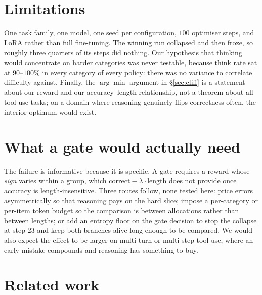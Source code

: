 \documentclass[10pt,twocolumn]{article}
\newcommand{\lam}{\lambda}
\begin{document}
\section{Limitations}

One task family, one model, one seed per configuration, $100$ optimiser steps,
and LoRA rather than full fine-tuning. The winning run collapsed and then froze,
so roughly three quarters of its steps did nothing. Our hypothesis that thinking
would concentrate on harder categories was never testable, because think rate sat
at $90$--$100\%$ in every category of every policy: there was no variance to
correlate difficulty against. Finally, the $\arg\min$ argument in
\S\ref{sec:cliff} is a statement about our reward and our accuracy--length
relationship, not a theorem about all tool-use tasks; on a domain where reasoning
genuinely flips correctness often, the interior optimum would exist.

\section{What a gate would actually need}

The failure is informative because it is specific. A gate requires a reward whose
\emph{sign} varies within a group, which $\text{correct}-\lam\cdot\text{length}$
does not provide once accuracy is length-insensitive. Three routes follow, none
tested here: price errors asymmetrically so that reasoning pays on the hard
slice; impose a per-category or per-item token budget so the comparison is
between allocations rather than between lengths; or add an entropy floor on the
gate decision to stop the collapse at step $23$ and keep both branches alive long
enough to be compared. We would also expect the effect to be larger on
multi-turn or multi-step tool use, where an early mistake compounds and reasoning
has something to buy.

\section{Related work}
\end{document}
